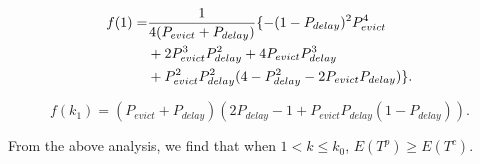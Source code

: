 \begin{enumerate}
  \begin{scriptsize}
  \begin{equation}
  \label{equ:f1}
  \begin{split}
    \scriptsize
    f(1) =& \frac{1}{4(P_{evict}+P_{delay})}\{-(1-P_{delay})^{2}P_{evict}^{4}\\ & + 2P_{evict}^{3}P_{delay}^{2} + 4P_{evict}P_{delay}^{3} \\ &+ P_{evict}^{2}P_{delay}^{2}(4-P_{delay}^{2} - 2P_{evict}P_{delay})\}.
  \end{split}\end{equation}\end{scriptsize}

  \begin{footnotesize}
  \begin{equation}
  \label{equ:fk1}
    f(k_{1}) = (P_{evict}+P_{delay})(2P_{delay}- 1 + P_{evict}P_{delay}(1 - P_{delay})).
  \end{equation}
  \end{footnotesize}




\end{enumerate}
From the above analysis, we find that when $1< k \leq k_{0}$, $E(T^{p}) \geq E(T^{c})$.

